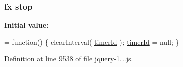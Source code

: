 \subsubsection[{\texorpdfstring{stop}{stop}}]{ {\bf fx} stop}\hypertarget{_scripts_2jquery-1_810_82_8js_ac9a544302040b74e845b33c285cd10e7}{}\label{_scripts_2jquery-1_810_82_8js_ac9a544302040b74e845b33c285cd10e7}
{\bfseries Initial value\+:}
\begin{DoxyCode}
= \textcolor{keyword}{function}() \{
    clearInterval( \hyperlink{obj_2_release_2_package_2_package_tmp_2_scripts_2jquery-1_810_82_8js_aa447439fbe7027e58837a297297c9d8a}{timerId} );
    \hyperlink{obj_2_release_2_package_2_package_tmp_2_scripts_2jquery-1_810_82_8js_aa447439fbe7027e58837a297297c9d8a}{timerId} = null;
\}
\end{DoxyCode}


Definition at line 9538 of file jquery-\/1...\+js.

